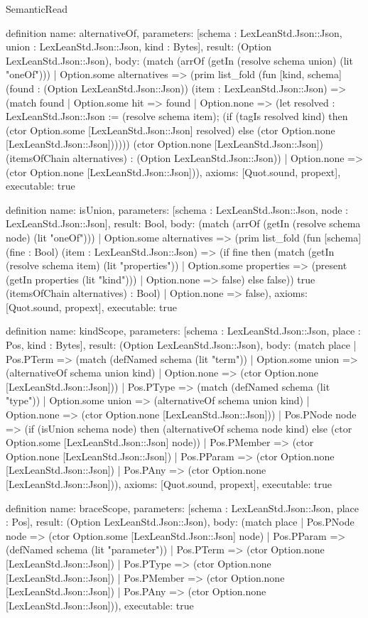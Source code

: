 \begin{lexlean}{SemanticRead}
\begin{semanticmodule}
definition{
  name: alternativeOf,
  parameters: [schema : LexLeanStd.Json::Json, union : LexLeanStd.Json::Json, kind : Bytes],
  result: (Option LexLeanStd.Json::Json),
  body: (match (arrOf (getIn (resolve schema union) (lit "oneOf")))
    | Option.some alternatives => (prim list_fold (fun [kind, schema] (found : (Option LexLeanStd.Json::Json)) (item : LexLeanStd.Json::Json) => (match found
      | Option.some hit => found
      | Option.none => (let resolved : LexLeanStd.Json::Json := (resolve schema item); (if (tagIs resolved kind) then (ctor Option.some [LexLeanStd.Json::Json] resolved) else (ctor Option.none [LexLeanStd.Json::Json]))))) (ctor Option.none [LexLeanStd.Json::Json]) (itemsOfChain alternatives) : (Option LexLeanStd.Json::Json))
    | Option.none => (ctor Option.none [LexLeanStd.Json::Json])),
  axioms: [Quot.sound, propext],
  executable: true
}

definition{
  name: isUnion,
  parameters: [schema : LexLeanStd.Json::Json, node : LexLeanStd.Json::Json],
  result: Bool,
  body: (match (arrOf (getIn (resolve schema node) (lit "oneOf")))
    | Option.some alternatives => (prim list_fold (fun [schema] (fine : Bool) (item : LexLeanStd.Json::Json) => (if fine then (match (getIn (resolve schema item) (lit "properties"))
      | Option.some properties => (present (getIn properties (lit "kind")))
      | Option.none => false) else false)) true (itemsOfChain alternatives) : Bool)
    | Option.none => false),
  axioms: [Quot.sound, propext],
  executable: true
}

definition{
  name: kindScope,
  parameters: [schema : LexLeanStd.Json::Json, place : Pos, kind : Bytes],
  result: (Option LexLeanStd.Json::Json),
  body: (match place
    | Pos.PTerm => (match (defNamed schema (lit "term"))
      | Option.some union => (alternativeOf schema union kind)
      | Option.none => (ctor Option.none [LexLeanStd.Json::Json]))
    | Pos.PType => (match (defNamed schema (lit "type"))
      | Option.some union => (alternativeOf schema union kind)
      | Option.none => (ctor Option.none [LexLeanStd.Json::Json]))
    | Pos.PNode node => (if (isUnion schema node) then (alternativeOf schema node kind) else (ctor Option.some [LexLeanStd.Json::Json] node))
    | Pos.PMember => (ctor Option.none [LexLeanStd.Json::Json])
    | Pos.PParam => (ctor Option.none [LexLeanStd.Json::Json])
    | Pos.PAny => (ctor Option.none [LexLeanStd.Json::Json])),
  axioms: [Quot.sound, propext],
  executable: true
}

definition{
  name: braceScope,
  parameters: [schema : LexLeanStd.Json::Json, place : Pos],
  result: (Option LexLeanStd.Json::Json),
  body: (match place
    | Pos.PNode node => (ctor Option.some [LexLeanStd.Json::Json] node)
    | Pos.PParam => (defNamed schema (lit "parameter"))
    | Pos.PTerm => (ctor Option.none [LexLeanStd.Json::Json])
    | Pos.PType => (ctor Option.none [LexLeanStd.Json::Json])
    | Pos.PMember => (ctor Option.none [LexLeanStd.Json::Json])
    | Pos.PAny => (ctor Option.none [LexLeanStd.Json::Json])),
  executable: true
}


\end{semanticmodule}
\end{lexlean}
